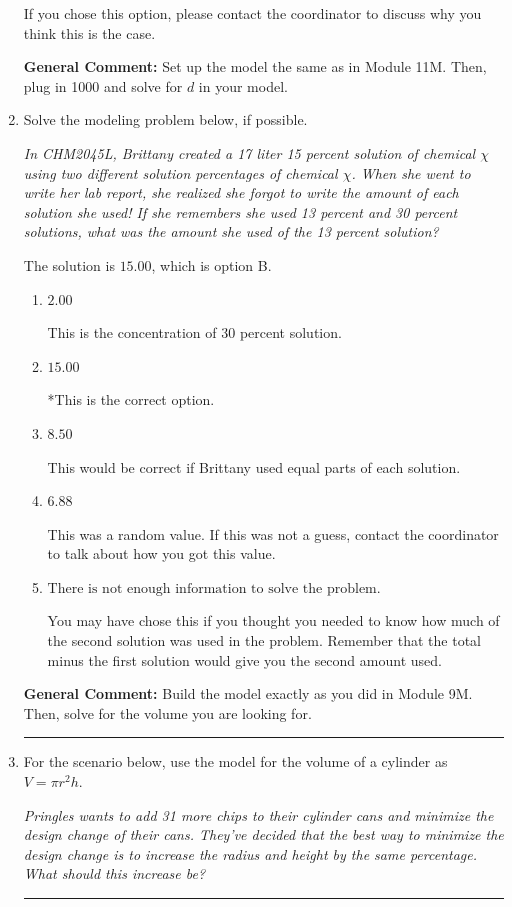 \documentclass{extbook}[14pt]
\newcommand{\litem}[1]{\item #1

\rule{\textwidth}{0.4pt}}
\begin{document}
\begin{enumerate}
{\begin{enumerate}[label=\Alph*.]
If you chose this option, please contact the coordinator to discuss why you think this is the case.
\end{enumerate}

\textbf{General Comment:} Set up the model the same as in Module 11M. Then, plug in 1000 and solve for $d$ in your model.
}
\litem{
Solve the modeling problem below, if possible.

\begin{center}
    \textit{ In CHM2045L, Brittany created a 17 liter 15 percent solution of chemical $\chi$ using two different solution percentages of chemical $\chi$. When she went to write her lab report, she realized she forgot to write the amount of each solution she used! If she remembers she used 13 percent and 30 percent solutions, what was the amount she used of the 13 percent solution? }
\end{center}


The solution is \( 15.00 \), which is option B.\begin{enumerate}[label=\Alph*.]
\item \( 2.00 \)

This is the concentration of 30 percent solution.
\item \( 15.00 \)

*This is the correct option.
\item \( 8.50 \)

This would be correct if Brittany used equal parts of each solution.
\item \( 6.88 \)

This was a random value. If this was not a guess, contact the coordinator to talk about how you got this value.
\item \( \text{There is not enough information to solve the problem.} \)

You may have chose this if you thought you needed to know how much of the second solution was used in the problem. Remember that the total minus the first solution would give you the second amount used.
\end{enumerate}

\textbf{General Comment:} Build the model exactly as you did in Module 9M. Then, solve for the volume you are looking for.
}
\litem{
For the scenario below, use the model for the volume of a cylinder as $V = \pi r^2 h$.

\begin{center}
    \textit{ Pringles wants to add 31 \text{percent} more chips to their cylinder cans and minimize the design change of their cans. They've decided that the best way to minimize the design change is to increase the radius and height by the same percentage. What should this increase be? }
\end{center}


}
\end{enumerate}
\end{document}
